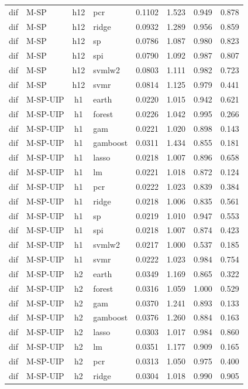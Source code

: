 \begin{ThreePartTable}
\begin{longtable}[t]{llclcccc}
dif & M-SP & h12 & pcr & 0.1102 & 1.523 & 0.949 & 0.878\\
dif & M-SP & h12 & ridge & 0.0932 & 1.289 & 0.956 & 0.859\\
dif & M-SP & h12 & sp & 0.0786 & 1.087 & 0.980 & 0.823\\
dif & M-SP & h12 & spi & 0.0790 & 1.092 & 0.987 & 0.807\\
dif & M-SP & h12 & svmlw2 & 0.0803 & 1.111 & 0.982 & 0.723\\
dif & M-SP & h12 & svmr & 0.0814 & 1.125 & 0.979 & 0.441\\
\addlinespace
dif & M-SP-UIP & h1 & earth & 0.0220 & 1.015 & 0.942 & 0.621\\
dif & M-SP-UIP & h1 & forest & 0.0226 & 1.042 & 0.995 & 0.266\\
dif & M-SP-UIP & h1 & gam & 0.0221 & 1.020 & 0.898 & 0.143\\
dif & M-SP-UIP & h1 & gamboost & 0.0311 & 1.434 & 0.855 & 0.181\\
dif & M-SP-UIP & h1 & lasso & 0.0218 & 1.007 & 0.896 & 0.658\\
dif & M-SP-UIP & h1 & lm & 0.0221 & 1.018 & 0.872 & 0.124\\
dif & M-SP-UIP & h1 & pcr & 0.0222 & 1.023 & 0.839 & 0.384\\
dif & M-SP-UIP & h1 & ridge & 0.0218 & 1.006 & 0.835 & 0.561\\
dif & M-SP-UIP & h1 & sp & 0.0219 & 1.010 & 0.947 & 0.553\\
dif & M-SP-UIP & h1 & spi & 0.0218 & 1.007 & 0.874 & 0.423\\
dif & M-SP-UIP & h1 & svmlw2 & 0.0217 & 1.000 & 0.537 & 0.185\\
dif & M-SP-UIP & h1 & svmr & 0.0222 & 1.023 & 0.984 & 0.754\\
\addlinespace
dif & M-SP-UIP & h2 & earth & 0.0349 & 1.169 & 0.865 & 0.322\\
dif & M-SP-UIP & h2 & forest & 0.0316 & 1.059 & 1.000 & 0.529\\
dif & M-SP-UIP & h2 & gam & 0.0370 & 1.241 & 0.893 & 0.133\\
dif & M-SP-UIP & h2 & gamboost & 0.0376 & 1.260 & 0.884 & 0.163\\
dif & M-SP-UIP & h2 & lasso & 0.0303 & 1.017 & 0.984 & 0.860\\
dif & M-SP-UIP & h2 & lm & 0.0351 & 1.177 & 0.909 & 0.165\\
dif & M-SP-UIP & h2 & pcr & 0.0313 & 1.050 & 0.975 & 0.400\\
dif & M-SP-UIP & h2 & ridge & 0.0304 & 1.018 & 0.990 & 0.905\\

\end{longtable}
\end{ThreePartTable}

